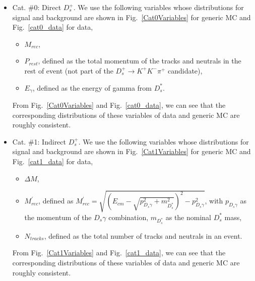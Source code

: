 \begin{itemize}
    \item Cat. \#0: Direct $D_{s}^{+}$. We use the following variables whose distributions for signal and background are shown in Fig.~\ref{Cat0Variables} for generic MC and Fig.~\ref{cat0_data} for data,
        \begin{itemize}
            \item[1. ] $M_{rec}$,
            \item[2. ] $P_{rest}$, defined as the total momentum of the tracks and neutrals in the rest of event (not part of the $D_{s}^{+} \rightarrow K^{+}K^{-}\pi^{+}$ candidate),
            \item[3. ] $E_{\gamma}$, defined as the energy of gamma from $D_{s}^{*}$.
        \end{itemize}
        From Fig.~\ref{Cat0Variables} and Fig.~\ref{cat0_data}, we can see that the corresponding distributions of these variables of data and generic MC are roughly consistent.
        

    \item Cat. \#1: Indirect $D_{s}^{+}$.
        We use the following variables whose distributions for signal and background are shown in Fig.~\ref{Cat1Variables} for generic MC and Fig.~\ref{cat1_data} for data,
        \begin{itemize}
            \item[1. ] $\Delta{M}$,
            \item[2. ] $M_{rec}^{'}$, defined as $M_{rec}^{'} = \sqrt{ {(E_{cm}  - \sqrt{p_{D_{s}\gamma}^{2} + m_{D_{s}^{*}}^{2}}) }^{2} - p_{D_{s}\gamma}^{2}}$, with $p_{D_{s}\gamma}$ as the momentum of the $D_{s}\gamma$ combination, $m_{D_{s}^{*}}$ as the nominal ${D_{s}^{*}}$ mass,
            \item[3. ] $N_{tracks}$, defined as the total number of tracks and neutrals in an event.
        \end{itemize}
        From Fig.~\ref{Cat1Variables} and Fig.~\ref{cat1_data}, we can see that the corresponding distributions of these variables of data and generic MC are roughly consistent.
\end{itemize}



